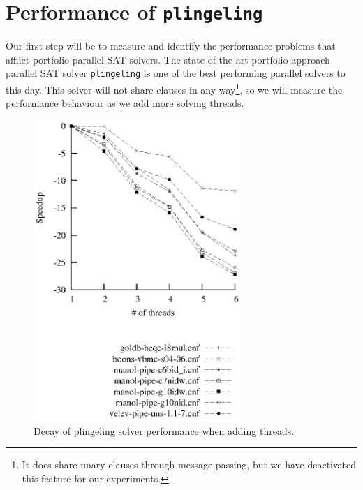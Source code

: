 \documentclass[12pt]{diicc}
\begin{document}
\section{Performance of \texttt{plingeling}}

Our first step will be to measure and identify the performance problems that afflict portfolio parallel SAT solvers. The state-of-the-art portfolio approach parallel SAT solver \texttt{plingeling} is one of the best performing parallel solvers to this day. This solver will not share clauses in any way\footnote{It does share unary clauses through message-passing, but we have deactivated this feature for our experiments.}, so we will measure the performance behaviour as we add more solving threads.

\begin{figure}[h!]
	\centering
		\includegraphics[width=0.7\textwidth]{plingeling_decay}
	\caption{Decay of plingeling solver performance when adding threads.}
	\label{fig:plingeling decay}
\end{figure}
\end{document}
